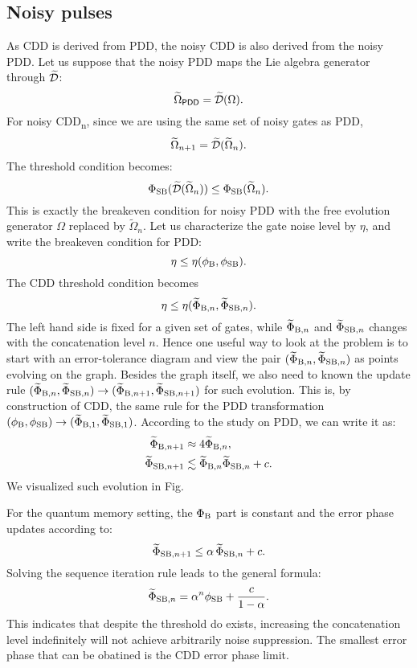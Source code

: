 \documentclass[b5paper,11pt]{article}
\newcommand{\wt}[1]{\widetilde{#1}}
\newcommand{\CDDn}{\textsf{CDD\textsubscript{n}}}
\begin{document}
\subsection{Noisy pulses}
As CDD is derived from PDD, the noisy CDD is also derived from the noisy PDD. 
Let us suppose that the noisy PDD maps the Lie algebra generator through $\wt\cD$:
\begin{equation}
 \wt\Omega_\mathsf{PDD} = \wt\cD(\Omega).
\end{equation}
For noisy \CDDn, since we are using the same set of noisy gates as PDD,
\begin{equation}
 \wt\Omega_{n+1}=\wt\cD (\wt\Omega_n).
\end{equation}
The threshold condition becomes:
\begin{equation}
 \Phi_\rSB(\wt\cD (\wt\Omega_{n})) \le \Phi_\rSB(\wt\Omega_{n}).
\end{equation}
This is exactly the breakeven condition for noisy PDD with the free evolution generator $\Omega$ replaced by $\wt\Omega_n$.
Let us characterize the gate noise level by $\eta$,
and write the breakeven condition for PDD:
\begin{equation}
 \eta \le \eta(\phi_{\mathrm{B}},\phi_{\mathrm{SB}}).
\end{equation}
The CDD threshold condition becomes 
\begin{equation}
 \eta \le \eta(\wt\Phi_{\rB,n},\wt\Phi_{\rSB,n}).
\end{equation}
The left hand side is fixed for a given set of gates, while $\wt\Phi_{\rB,n}$ and  $\wt\Phi_{\rSB,n}$ changes with the concatenation level $n$. Hence one useful way to look at the problem is to start with an error-tolerance diagram and view the pair $(\wt\Phi_{\rB,n},\wt\Phi_{\rSB,n})$ as points evolving on the graph. Besides the graph itself, we also need to known the update rule
$(\wt\Phi_{\rB,n},\wt\Phi_{\rSB,n})\to(\wt\Phi_{\rB,n+1},\wt\Phi_{\rSB,n+1})$  for such evolution. This is, by construction of CDD, the same rule for the PDD transformation $(\phi_{\rB},\phi_{\rSB})\to(\wt\Phi_{\rB,1},\wt\Phi_{\rSB,1})$. 
According to the study on PDD, we can write it as: 
\begin{align}
 \wt\Phi_{\rB,n+1} &\approx 4\wt\Phi_{\rB,n},\\
 \wt\Phi_{\rSB,n+1} &\lesssim \wt\Phi_{\rB,n} \wt\Phi_{\rSB,n} + c.
\end{align}
We visualized such evolution in Fig. 

For the quantum memory setting, the $\Phi_{\mathrm{B}}$ part is constant and the error phase updates according to:
\begin{equation}
 \wt\Phi_{\rSB,n+1} \le \alpha\, \wt\Phi_{\rSB,n} +c.
\end{equation}
Solving the sequence iteration rule leads to the general formula:
\begin{equation}
 \wt\Phi_{\rSB,n} = \alpha^n \phi_\rSB + \frac{c}{1-\alpha}.
\end{equation}
This indicates that despite the threshold do exists, increasing the concatenation level indefinitely will not achieve arbitrarily noise suppression. The smallest error phase that can be obatined is the CDD error phase limit.
\end{document}
